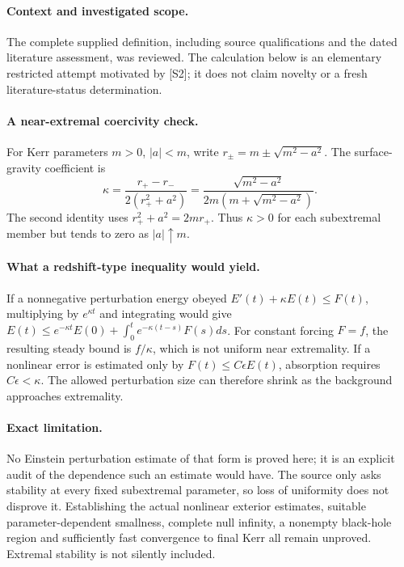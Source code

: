 \documentclass[11pt]{article}
\begin{document}
\paragraph{Context and investigated scope.} The complete supplied definition, including source qualifications and the dated literature assessment, was reviewed. The calculation below is an elementary restricted attempt motivated by [S2]; it does not claim novelty or a fresh literature-status determination.

\paragraph{A near-extremal coercivity check.} For Kerr parameters $m>0$, $|a|<m$, write $r_\pm=m\pm\sqrt{m^2-a^2}$. The surface-gravity coefficient is
\[
 \kappa=\frac{r_+-r_-}{2(r_+^2+a^2)}
 =\frac{\sqrt{m^2-a^2}}{2m(m+\sqrt{m^2-a^2})}.
\]
The second identity uses $r_+^2+a^2=2mr_+$. Thus $\kappa>0$ for each subextremal member but tends to zero as $|a|\uparrow m$.

\paragraph{What a redshift-type inequality would yield.} If a nonnegative perturbation energy obeyed $E'(t)+\kappa E(t)\leq F(t)$, multiplying by $e^{\kappa t}$ and integrating would give $E(t)\leq e^{-\kappa t}E(0)+\int_0^te^{-\kappa(t-s)}F(s)ds$. For constant forcing $F=f$, the resulting steady bound is $f/\kappa$, which is not uniform near extremality. If a nonlinear error is estimated only by $F(t)\leq C\epsilon E(t)$, absorption requires $C\epsilon<\kappa$. The allowed perturbation size can therefore shrink as the background approaches extremality.

\paragraph{Exact limitation.} No Einstein perturbation estimate of that form is proved here; it is an explicit audit of the dependence such an estimate would have. The source only asks stability at every fixed subextremal parameter, so loss of uniformity does not disprove it. Establishing the actual nonlinear exterior estimates, suitable parameter-dependent smallness, complete null infinity, a nonempty black-hole region and sufficiently fast convergence to final Kerr all remain unproved. Extremal stability is not silently included.
\end{document}
